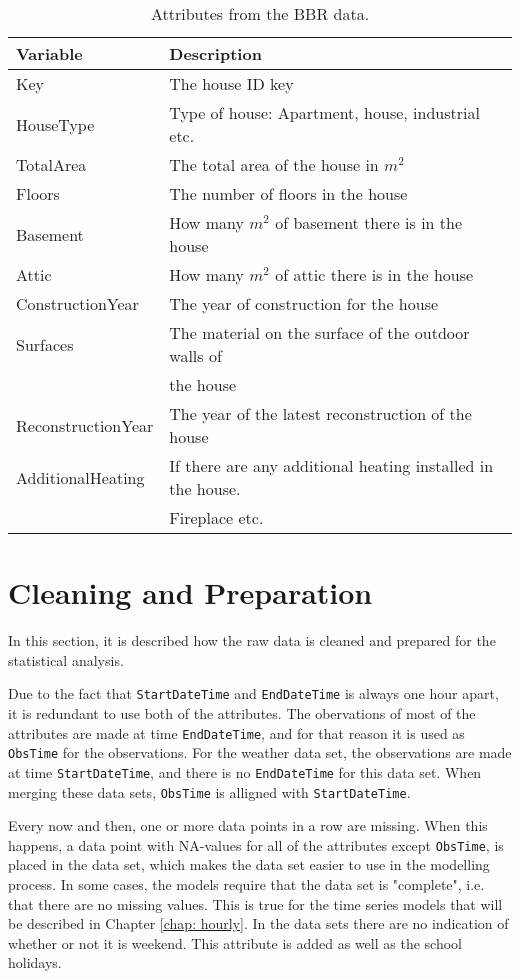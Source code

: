 \begin{table}[h]
    \centering
    \begin{tabular}{ll}
     \hline
     \textbf{Variable} & \textbf{Description} \\
    \hline
    \hline
    Key  &  The house ID key\\
    HouseType  &  Type of house: Apartment, house, industrial etc. \\
    TotalArea  & The total area of the house in $m^2$ \\
    Floors  & The number of floors in the house \\
    Basement  & How many $m^2$ of basement there is in the house \\
    Attic  & How many $m^2$ of attic there is in the house \\
    ConstructionYear  & The year of construction for the house  \\
    Surfaces  & The material on the surface of the outdoor walls of \\ & the house \\
    ReconstructionYear  & The year of the latest reconstruction of the house \\
    AdditionalHeating  & If there are any additional heating installed in the house. \\ & Fireplace etc. \\
    \hline
    \end{tabular}
    \caption{Attributes from the BBR data.}
    \label{tab: BBR}
\end{table}

\section{Cleaning and Preparation}
In this section, it is described how the raw data is cleaned and prepared for the statistical analysis.

\noindent Due to the fact that \texttt{StartDateTime} and \texttt{EndDateTime} is always one hour apart, it is redundant to use both of the attributes. The obervations of most of the attributes are made at time \texttt{EndDateTime}, and for that reason it is used as \texttt{ObsTime} for the observations. For the weather data set, the observations are made at time \texttt{StartDateTime}, and there is no \texttt{EndDateTime} for this data set. When merging these data sets, \texttt{ObsTime} is alligned with \texttt{StartDateTime}. 

\noindent Every now and then, one or more data points in a row are missing. When this happens, a data point with NA-values for all of the attributes except \texttt{ObsTime}, is placed in the data set, which makes the data set easier to use in the modelling process. In some cases, the models require that the data set is "complete", i.e. that there are no missing values. This is true for the time series models that will be described in Chapter \ref{chap: hourly}. In the data sets there are no indication of whether or not it is weekend. This attribute is added as well as the school holidays.

